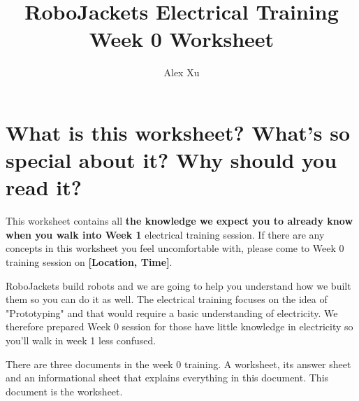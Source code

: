 \documentclass{article}
\title{RoboJackets Electrical Training Week 0 Worksheet}
\author{Alex Xu}
\begin{document}
\maketitle{}
\setcounter{tocdepth}{2}
\tableofcontents
\pagebreak

\section{What is this worksheet? What's so special about it? Why should you read it?}
This worksheet contains all \textbf{the knowledge we expect you to already know when you walk into Week 1} electrical training session. If there are any concepts in this worksheet you feel uncomfortable with, please come to Week 0 training session on \textbf{[Location, Time]}.\vspace{6pt}\par
RoboJackets build robots and we are going to help you understand how we built them so you can do it as well. The electrical training  focuses on the idea of "Prototyping" and that would require a basic understanding of electricity. We therefore prepared Week 0 session for those have little knowledge in electricity so you'll walk in week 1 less confused. \vspace{6pt}\par
There are three documents in the week 0 training. A worksheet, its answer sheet and an informational sheet that explains everything in this document. This document is the worksheet. 
\end{document}

